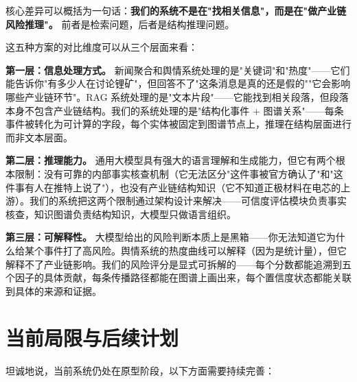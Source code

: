 \documentclass[12pt,a4paper]{ctexart}
\begin{document}
核心差异可以概括为一句话：\textbf{我们的系统不是在"找相关信息"，而是在"做产业链风险推理"。} 前者是检索问题，后者是结构推理问题。

这五种方案的对比维度可以从三个层面来看：

\textbf{第一层：信息处理方式。} 新闻聚合和舆情系统处理的是"关键词"和"热度"——它们能告诉你"有多少人在讨论锂矿"，但回答不了"这条消息是真的还是假的""它会影响哪些产业链环节"。RAG 系统处理的是"文本片段"——它能找到相关段落，但段落本身不包含产业链结构。我们的系统处理的是"结构化事件 + 图谱关系"——每条事件被转化为可计算的字段，每个实体被固定到图谱节点上，推理在结构层面进行而非文本层面。

\textbf{第二层：推理能力。} 通用大模型具有强大的语言理解和生成能力，但它有两个根本限制：没有可靠的内部事实核查机制（它无法区分"这件事被官方确认了"和"这件事有人在推特上说了"），也没有产业链结构知识（它不知道正极材料在电芯的上游）。我们的系统把这两个限制通过架构设计来解决——可信度评估模块负责事实核查，知识图谱负责结构知识，大模型只做语言组织。

\textbf{第三层：可解释性。} 大模型给出的风险判断本质上是黑箱——你无法知道它为什么给某个事件打了高风险。舆情系统的热度曲线可以解释（因为是统计量），但它解释不了产业链影响。我们的风险评分是显式可拆解的——每个分数都能追溯到五个因子的具体贡献，每条传播路径都能在图谱上画出来，每个置信度状态都能关联到具体的来源和证据。

\section{当前局限与后续计划}

坦诚地说，当前系统仍处在原型阶段，以下方面需要持续完善：
\end{document}
